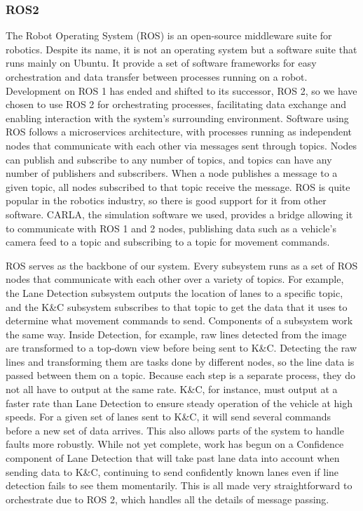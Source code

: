 \documentclass[titlepage,draft]{article}
\begin{document}
{\subsubsection{ROS2}
The Robot Operating System (ROS) is an open-source middleware suite for robotics. Despite its name, it is not an operating system but a software suite that runs mainly on Ubuntu. It provide a set of software frameworks for easy orchestration and data transfer between processes running on a robot.\cite{ros_documentation} Development on ROS 1 has ended and shifted to its successor, ROS 2, so we have chosen to use ROS 2 for orchestrating processes, facilitating data exchange and enabling interaction with the system’s surrounding environment. Software using ROS follows a microservices architecture, with processes running as independent nodes that communicate with each other via messages sent through topics. Nodes can publish and subscribe to any number of topics, and topics can have any number of publishers and subscribers. When a node publishes a message to a given topic, all nodes subscribed to that topic receive the message. ROS is quite popular in the robotics industry, so there is good support for it from other software. CARLA, the simulation software we used, provides a bridge allowing it to communicate with ROS 1 and 2 nodes, publishing data such as a vehicle's camera feed to a topic and subscribing to a topic for movement commands.

ROS serves as the backbone of our system. Every subsystem runs as a set of ROS nodes that communicate with each other over a variety of topics. For example, the Lane Detection subsystem outputs the location of lanes to a specific topic, and the K\&C subsystem subscribes to that topic to get the data that it uses to determine what movement commands to send. Components of a subsystem work the same way. Inside Detection, for example, raw lines detected from the image are transformed to a top-down view before being sent to K\&C. Detecting the raw lines and transforming them are tasks done by different nodes, so the line data is passed between them on a topic. Because each step is a separate process, they do not all have to output at the same rate. K\&C, for instance, must output at a faster rate than Lane Detection to ensure steady operation of the vehicle at high speeds. For a given set of lanes sent to K\&C, it will send several commands before a new set of data arrives. This also allows parts of the system to handle faults more robustly. While not yet complete, work has begun on a Confidence component of Lane Detection that will take past lane data into account when sending data to K\&C, continuing to send confidently known lanes even if line detection fails to see them momentarily. This is all made very straightforward to orchestrate due to ROS 2, which handles all the details of message passing.

}
\end{document}

